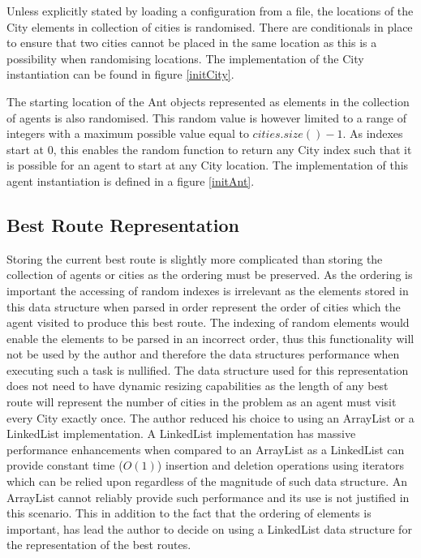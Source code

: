 Unless explicitly stated by loading a configuration from a file, the locations of the City elements in collection of cities is randomised. There are conditionals in place to ensure that two cities cannot be placed in the same location as this is a possibility when randomising locations. The implementation of the City instantiation can be found in figure \ref{initCity}.

The starting location of the Ant objects represented as elements in the collection of agents is also randomised. This random value is however limited to a range of integers with a maximum possible value equal to $cities.size() - 1$. As indexes start at 0, this enables the random function to return any City index such that it is possible for an agent to start at any City location. The implementation of this agent instantiation is defined in a figure \ref{initAnt}.

\subsection{Best Route Representation}
\label{bestrtoutey}
Storing the current best route is slightly more complicated than storing the collection of agents or cities as the ordering must be preserved. As the ordering is important the accessing of random indexes is irrelevant as the elements stored in this data structure when parsed in order represent the order of cities which the agent visited to produce this best route. The indexing of random elements would enable the elements to be parsed in an incorrect order, thus this functionality will not be used by the author and therefore the data structures performance when executing such a task is nullified. The data structure used for this representation does not need to have dynamic resizing capabilities as the length of any best route will represent the number of cities in the problem as an agent must visit every City exactly once. The author reduced his choice to using an ArrayList or a LinkedList implementation. A LinkedList implementation has massive performance enhancements when compared to an ArrayList as a LinkedList can provide constant time ($O(1)$) insertion and deletion operations using iterators which can be relied upon regardless of the magnitude of such data structure. An ArrayList cannot reliably provide such performance and its use is not justified in this scenario. This in addition to the fact that the ordering of elements is important, has lead the author to decide on using a LinkedList data structure for the representation of the best routes.


